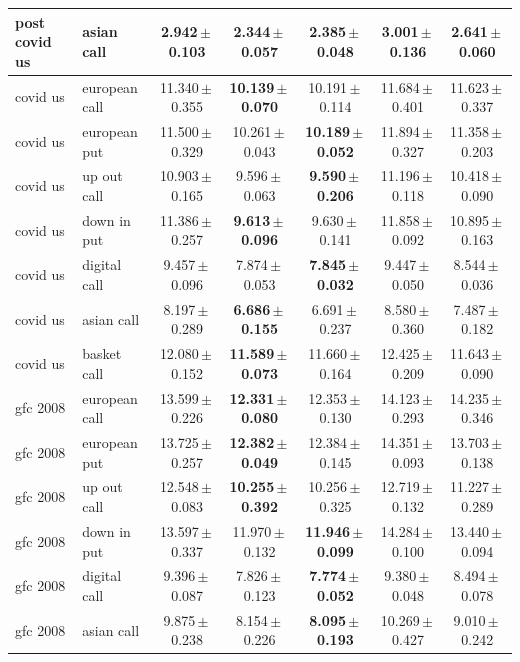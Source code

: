 \begin{table}[h]
\begin{tabular}{llccccc}
post covid us & asian call & 2.942\,$\pm$\,0.103 & \textbf{2.344\,$\pm$\,0.057} & 2.385\,$\pm$\,0.048 & 3.001\,$\pm$\,0.136 & 2.641\,$\pm$\,0.060 \\
\midrule
covid us & european call & 11.340\,$\pm$\,0.355 & \textbf{10.139\,$\pm$\,0.070} & 10.191\,$\pm$\,0.114 & 11.684\,$\pm$\,0.401 & 11.623\,$\pm$\,0.337 \\
covid us & european put & 11.500\,$\pm$\,0.329 & 10.261\,$\pm$\,0.043 & \textbf{10.189\,$\pm$\,0.052} & 11.894\,$\pm$\,0.327 & 11.358\,$\pm$\,0.203 \\
covid us & up out call & 10.903\,$\pm$\,0.165 & 9.596\,$\pm$\,0.063 & \textbf{9.590\,$\pm$\,0.206} & 11.196\,$\pm$\,0.118 & 10.418\,$\pm$\,0.090 \\
covid us & down in put & 11.386\,$\pm$\,0.257 & \textbf{9.613\,$\pm$\,0.096} & 9.630\,$\pm$\,0.141 & 11.858\,$\pm$\,0.092 & 10.895\,$\pm$\,0.163 \\
covid us & digital call & 9.457\,$\pm$\,0.096 & 7.874\,$\pm$\,0.053 & \textbf{7.845\,$\pm$\,0.032} & 9.447\,$\pm$\,0.050 & 8.544\,$\pm$\,0.036 \\
covid us & asian call & 8.197\,$\pm$\,0.289 & \textbf{6.686\,$\pm$\,0.155} & 6.691\,$\pm$\,0.237 & 8.580\,$\pm$\,0.360 & 7.487\,$\pm$\,0.182 \\
covid us & basket call & 12.080\,$\pm$\,0.152 & \textbf{11.589\,$\pm$\,0.073} & 11.660\,$\pm$\,0.164 & 12.425\,$\pm$\,0.209 & 11.643\,$\pm$\,0.090 \\
\midrule
gfc 2008 & european call & 13.599\,$\pm$\,0.226 & \textbf{12.331\,$\pm$\,0.080} & 12.353\,$\pm$\,0.130 & 14.123\,$\pm$\,0.293 & 14.235\,$\pm$\,0.346 \\
gfc 2008 & european put & 13.725\,$\pm$\,0.257 & \textbf{12.382\,$\pm$\,0.049} & 12.384\,$\pm$\,0.145 & 14.351\,$\pm$\,0.093 & 13.703\,$\pm$\,0.138 \\
gfc 2008 & up out call & 12.548\,$\pm$\,0.083 & \textbf{10.255\,$\pm$\,0.392} & 10.256\,$\pm$\,0.325 & 12.719\,$\pm$\,0.132 & 11.227\,$\pm$\,0.289 \\
gfc 2008 & down in put & 13.597\,$\pm$\,0.337 & 11.970\,$\pm$\,0.132 & \textbf{11.946\,$\pm$\,0.099} & 14.284\,$\pm$\,0.100 & 13.440\,$\pm$\,0.094 \\
gfc 2008 & digital call & 9.396\,$\pm$\,0.087 & 7.826\,$\pm$\,0.123 & \textbf{7.774\,$\pm$\,0.052} & 9.380\,$\pm$\,0.048 & 8.494\,$\pm$\,0.078 \\
gfc 2008 & asian call & 9.875\,$\pm$\,0.238 & 8.154\,$\pm$\,0.226 & \textbf{8.095\,$\pm$\,0.193} & 10.269\,$\pm$\,0.427 & 9.010\,$\pm$\,0.242 \\
\bottomrule
\end{tabular}
\end{table}

